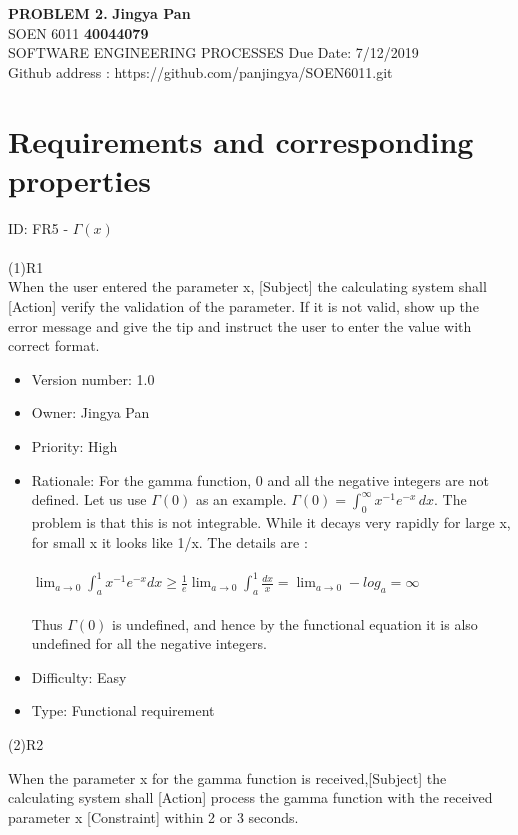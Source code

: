 \documentclass[a4paper, 11pt]{article}
\begin{document}
\noindent
\large\textbf{PROBLEM 2.} \hfill \textbf{Jingya Pan} \\
\normalsize SOEN 6011 \hfill \textbf{40044079} \\
 SOFTWARE ENGINEERING PROCESSES \hfill Due Date: 7/12/2019 \\
\hfill Github address : https://github.com/panjingya/SOEN6011.git

\section{Requirements and corresponding properties}
\indent ID:  FR5 - $\Gamma \left( x \right)$ \\ \\
(1)R1 \\
\indent When the user entered the parameter x, [Subject] the calculating system shall [Action] verify the validation of the parameter. If it is not valid, show up the error message and give the tip and instruct the user to enter the value with correct format. 

\begin{itemize}
    \item Version number: 1.0
    \item Owner: Jingya Pan
    \item Priority: High
    \item Rationale: For the gamma function, 0 and all the negative integers are not defined. Let us use $\Gamma \left( 0 \right)$ as an example. ${\displaystyle \Gamma (0)=\int _{0}^{\infty }x^{-1}e^{-x}\,dx}$. The problem is that this is not integrable. While it decays very rapidly for large x, for small x it looks like 1/x. The details are : \\\\
     $\lim_{a \to 0}\int _{a}^{1}x^{-1}e^{-x}dx \geq \frac{1}{e}\lim_{a \to 0}\int _{a}^{1} \frac{dx}{x}=\lim_{a \to 0}-log_a=\infty$ \\\\
    Thus $\Gamma \left( 0 \right)$ is undefined, and hence by the functional equation it is also undefined for all the negative integers.
    \item Difficulty: Easy
    \item Type: Functional requirement
\end{itemize}
(2)R2

\indent When the parameter x for the gamma function is received,[Subject] the calculating system shall [Action] process the gamma function with the received parameter x [Constraint] within  2 or 3 seconds. 
\end{document}
